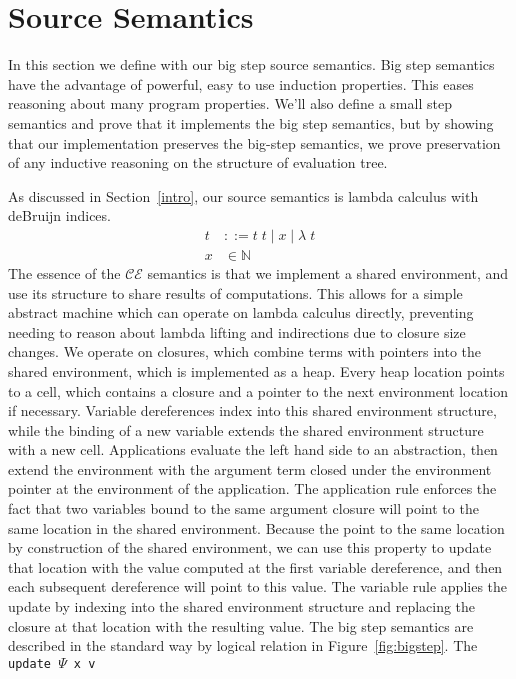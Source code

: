 \section{Source Semantics} \label{cem_big}

In this section we define with our big step source semantics. Big step semantics
have the advantage of powerful, easy to use induction properties. This eases
reasoning about many program properties. We'll also define a small step
semantics and prove that it implements the big step semantics, but by showing
that our implementation preserves the big-step semantics, we prove preservation
of any inductive reasoning on the structure of evaluation tree.  

As discussed in Section~\ref{intro}, our source semantics is lambda calculus
with deBruijn indices. 
\begin{align*}
 t &::= t \; t \; | \; x \; | \;  \lambda \; t \\
 x &\in \mathbb{N}
\end{align*}
The essence of the $\mathcal{CE}$ semantics is that we implement a shared
environment, and use its structure to share results of computations. This allows
for a simple abstract machine which can operate on lambda calculus directly,
preventing needing to reason about lambda lifting and indirections due to
closure size changes. We operate on closures, which combine terms with
pointers into the shared environment, which is implemented as a heap. Every
heap location points to a cell, which contains a closure and a pointer to the
next environment location if necessary. Variable dereferences index into this
shared environment structure, while the binding of a new variable extends the
shared environment structure with a new cell. Applications evaluate the left
hand side to an abstraction, then extend the environment with the argument term
closed under the environment pointer at the environment of the application. The
application rule enforces the fact that two variables bound to the same argument
closure will point to the same location in the shared environment. Because the
point to the same location by construction of the shared environment, we can use
this property to update that location with the value computed at the first
variable dereference, and then each subsequent dereference will point to this
value. The variable rule applies the update by indexing into the shared
environment structure and replacing the closure at that location with the
resulting value. The big step semantics are described in the standard way by
logical relation in Figure~\ref{fig:bigstep}. The \texttt{update $\Psi$ x v}
